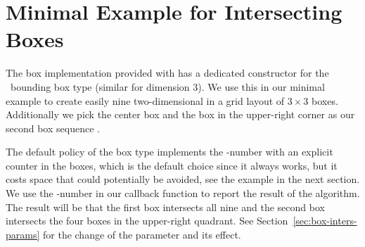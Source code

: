 



\section{Minimal Example for Intersecting Boxes}
\label{sec:box-intersect-minimal}

The box implementation provided with
 has a dedicated
constructor for the \cgal\ bounding box type 
(similar for dimension 3). We use this in our minimal example to
create easily nine two-dimensional  in a grid layout of $3
\times 3$ boxes. Additionally we pick the center box and the box in
the upper-right corner as our second box sequence .

The default policy of the box type implements the -number with
an explicit counter in the boxes, which is the default choice since it
always works, but it costs space that could potentially be avoided,
see the example in the next section. We use the -number in our
callback function to report the result of the  algorithm.
The result will be that the first  box intersects all nine
 and the second  box intersects the four boxes
in the upper-right quadrant. See Section~\ref{sec:box-inters-params}
for the change of the  parameter and its effect.

